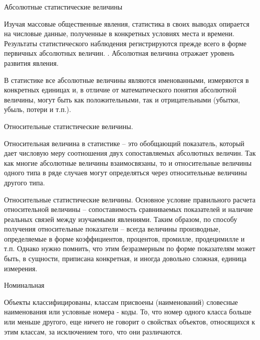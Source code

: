 \documentclass{beamer}
\begin{document}
\begin{frame}{Абсолютные статистические величины} 

Изучая массовые общественные явления, статистика в своих выводах опирается на числовые данные, полученные в конкретных условиях места и времени. Результаты статистического наблюдения регистрируются прежде всего в форме первичных абсолютных величин. . Абсолютная величина отражает уровень развития явления.

В статистике все абсолютные величины являются именованными, измеряются в конкретных единицах и, в отличие от математического понятия абсолютной величины, могут быть как положительными, так и отрицательными (убытки, убыль, потери и т.п.).

\end{frame}

\begin{frame}{Относительные статистические величины.}

Относительная величина в статистике – это обобщающий показатель, который дает числовую меру соотношения двух сопоставляемых абсолютных величин. Так как многие абсолютные величины взаимосвязаны, то и относительные величины одного типа в ряде случаев могут определяться через относительные величины другого типа.

\end{frame}

\begin{frame}{Относительные статистические величины.}
Основное условие правильного расчета относительной величины – сопоставимость сравниваемых показателей и наличие реальных связей между изучаемыми явлениями. Таким образом, по способу получения относительные показатели – всегда величины производные, определяемые в форме коэффициентов, процентов, промилле, продецимилле и т.п. Однако нужно помнить, что этим безразмерным по форме показателям может быть, в сущности, приписана конкретная, и иногда довольно сложная, единица измерения. 


\end{frame}


\begin{frame}{Номинальная}

Объекты классифицированы, классам присвоены
(наименований) словесные наименования или условные номера -
коды. То, что номер одного класса больше или
меньше другого, еще ничего не говорит о свойствах объектов, относящихся к этим классам, за
исключением того, что они различаются.

\end{frame}
\end{document}
